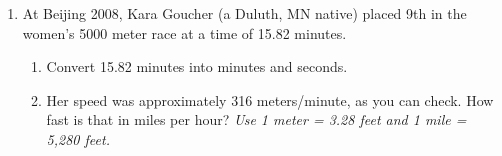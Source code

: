 \documentclass[12pt]{article}
\begin{document}
\begin{enumerate}
\newpage

\item At Beijing 2008, Kara Goucher (a Duluth, MN native) placed 9th in the women's 5000 meter race at a time of 15.82 minutes.

\begin{enumerate}
\item Convert 15.82 minutes into minutes and seconds.
\vfill
\vfill
\item Her speed was approximately 316 meters/minute, as you can check.  How fast is that in miles per hour?  \emph{Use 1 meter = 3.28 feet and 1 mile = 5,280 feet.}
\vfill
\vfill
\vfill
\end{enumerate}

\end{enumerate}
\end{document}
